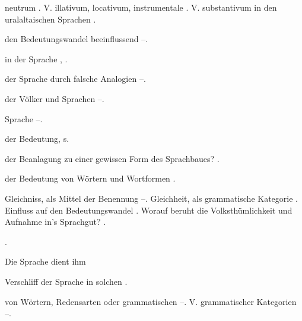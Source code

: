 \begin{register}
 neutrum \pageref{sp.102}. V. illativum, locativum, instrumentale \pageref{sp.416}. V. substantivum in den uralaltaischen Sprachen \pageref{sp.416}.

 den Bedeutungswandel beeinflussend \pageref{sp.239}–\pageref{sp.243}.

 in der Sprache \pageref{sp.433}, \pageref{sp.436}.

 der Sprache durch falsche Analogien \pageref{sp.211}–\pageref{sp.212}.

 der Völker und Sprachen \pageref{sp.176}–\pageref{sp.179}.

 Sprache \pageref{sp.176}–\pageref{sp.179}.

 der Bedeutung, s. 

 der Beanlagung zu einer gewissen Form des Sprachbaues? \pageref{sp.61}.


 der Bedeutung von Wörtern und Wortformen \pageref{sp.403}.

 Gleichniss, als Mittel der Benennung \pageref{sp.40}–\pageref{sp.43}. Gleichheit,  als grammatische Kategorie \pageref{sp.103}. Einfluss auf den Bedeutungswandel \pageref{sp.234}. Worauf beruht die Volksthümlichkeit und Aufnahme in’s Sprachgut? \pageref{sp.314}.

  \pageref{sp.10}.


 Die Sprache dient ihm  

 Verschliff der Sprache in solchen \pageref{sp.184}.


 von Wörtern, Redensarten oder grammatischen  \sed{\pageref{sp.230},} \pageref{sp.227}–\pageref{sp.258}. V. grammatischer Kategorien \pageref{sp.253}–\pageref{sp.255}.


\end{register}
